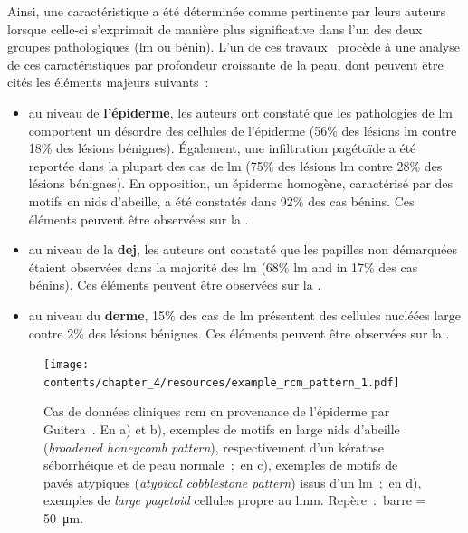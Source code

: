 Ainsi, une caractéristique a été déterminée comme pertinente par leurs auteurs lorsque celle-ci s'exprimait de manière plus significative dans l'un des deux groupes pathologiques (\gls{lm} ou bénin). L'un de ces travaux~\cite{Guitera2010} procède à une analyse de ces caractéristiques par profondeur croissante de la peau, dont peuvent être cités les éléments majeurs suivants~:
\begin{itemize}
    \item au niveau de \textbf{l'épiderme}, les auteurs ont constaté que les pathologies de \gls{lm} comportent un désordre des cellules de l'épiderme (56\% des lésions \gls{lm} contre 18\% des lésions bénignes). Également, une infiltration pagétoïde a été reportée dans la plupart des cas de \gls{lm} (75\% des lésions \gls{lm} contre 28\% des lésions bénignes). En opposition, un épiderme homogène, caractérisé par des motifs en nids d'abeille, a été constatés dans 92\% des cas bénins. Ces éléments peuvent être observées sur la .
    \item au niveau de la \textbf{\gls{dej}}, les auteurs ont constaté que les papilles non démarquées étaient observées dans la majorité des \gls{lm} (68\% \gls{lm} and in 17\% des cas bénins). Ces éléments peuvent être observées sur la  .
    \item au niveau du \textbf{derme}, 15\% des cas de \gls{lm} présentent des cellules nucléées large contre 2\% des lésions bénignes. Ces éléments peuvent être observées sur la .
\end{itemize}\par

\begin{figure}[H]
    \begin{center}
        \texttt{[image: contents/chapter\_4/resources/example\_rcm\_pattern\_1.pdf]}
        \caption{Cas de données cliniques \gls{rcm} en provenance de l'épiderme par Guitera~\cite{Guitera2010}. En a) et b), exemples de motifs en large nids d'abeille (\textit{broadened honeycomb pattern}), respectivement d'un kératose séborrhéique et de peau normale~;~en c), exemples de motifs de pavés atypiques (\textit{atypical cobblestone pattern}) issus d'un \gls{lm}~;~en d), exemples de \textit{large pagetoid} cellules propre au \gls{lmm}. Repère~:~barre = \SI{50}{\micro\metre}.}
        \label{fig:example_rcm_pattern_1}
    \end{center} 
\end{figure}\par

